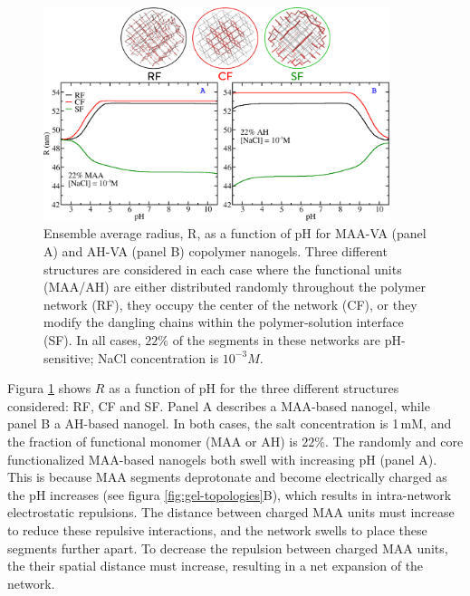 \begin{figure}[!htb]
     \centering
     \includegraphics[width=0.9\textwidth]{Figures/graphs-gel2/rr.png}
     \caption{Ensemble average radius, R, as a function of pH for MAA-VA (panel A) and AH-VA (panel B) copolymer nanogels. 
     Three different structures are considered in each case where the functional units (MAA/AH) are either distributed randomly throughout the polymer network (RF), they occupy the center of the network (CF), or they modify the dangling chains within the polymer-solution interface (SF).
     In all cases, $22\%$ of the segments in these networks are pH-sensitive; NaCl concentration is $10^{-3}M$.}
     \label{fig:gel-charge-MAA-AH}
\end{figure}



Figura \ref{fig:gel-charge-MAA-AH} shows $R$  as a function of  pH for the  three different structures considered: RF, CF and SF. 
Panel A describes a MAA-based nanogel, while  panel B a AH-based nanogel.
In both cases, the salt concentration is 1\,mM, and the fraction of functional monomer (MAA or AH) is  $22\%$.
The randomly and core functionalized MAA-based nanogels both swell with increasing pH (panel A).
This is because MAA segments deprotonate and become electrically charged as the pH increases (see figura \ref{fig:gel-topologies}B), which results in intra-network electrostatic repulsions.
The distance between charged MAA units must increase to reduce these repulsive interactions, and the network swells to place these segments further apart.
To decrease the repulsion between charged MAA units, the their spatial distance must increase, resulting in a net expansion of the network.



